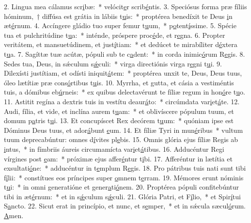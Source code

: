 2. Lingua mea cálamus scr\uline{i}bæ:~* velócit\uline{e}r scrib\uline{é}ntis.
3. Speciósus forma præ fíliis hóminum,~† diffúsa est grátia in lábiis t\uline{u}is:~* proptérea benedíxit te Deus \uline{i}n æt\uline{é}rnum.
4. Accíngere gládio tuo super femur t\uline{u}um,~* p\uline{o}tent\uline{í}ssime.
5. Spécie tua et pulchritúdine t\uline{u}a:~* inténde, próspere proc\uline{é}de, et r\uline{e}gna.
6. Propter veritátem, et mansuetúdinem, et just\uline{í}tiam:~* et dedúcet te mirabíliter d\uline{é}xtera t\uline{u}a.
7. Sagíttæ tuæ acútæ, pópuli sub te c\uline{a}dent:~* in corda inimic\uline{ó}rum R\uline{e}gis.
8. Sedes tua, Deus, in sǽculum s\uline{ǽ}culi:~* virga directiónis virga r\uline{e}gni t\uline{u}i.
9. Dilexísti justítiam, et odísti iniquit\uline{á}tem:~* proptérea unxit te, Deus, Deus tuus, óleo lætítiæ præ cons\uline{ó}rtibus t\uline{u}is.
10. Myrrha, et gutta, et cásia a vestiméntis tuis, a dómibus eb\uline{ú}rneis:~* ex quibus delectavérunt te fíliæ regum in hon\uline{ó}re t\uline{u}o.
11. Astitit regína a dextris tuis in vestítu deaur\uline{á}to:~* circúmdata var\uline{i}et\uline{á}te.
12. Audi, fília, et vide, et inclína aurem t\uline{u}am:~* et oblivíscere pópulum tuum, et domum p\uline{a}tris t\uline{u}i.
13. Et concupíscet Rex decórem t\uline{u}um:~* quóniam ipse est Dóminus Deus tuus, et ador\uline{á}bunt \uline{e}um.
14. Et fíliæ Tyri in mun\uline{é}ribus~* vultum tuum deprecabúntur: omnes d\uline{í}vites pl\uline{e}bis.
15. Omnis glória ejus fíliæ Regis ab \uline{i}ntus,~* in fímbriis áureis circumamícta var\uline{i}et\uline{á}tibus.
16. Adducéntur Regi vírgines post \uline{e}am:~* próximæ ejus affer\uline{é}ntur t\uline{i}bi.
17. Afferéntur in lætítia et exsultati\uline{ó}ne:~* adducéntur in t\uline{e}mplum R\uline{e}gis.
18. Pro pátribus tuis nati sunt tibi f\uline{í}lii:~* constítues eos príncipes super \uline{o}mnem t\uline{e}rram.
19. Mémores erunt nóminis t\uline{u}i:~* in omni generatióne et gener\uline{a}ti\uline{ó}nem.
20. Proptérea pópuli confitebúntur tibi in æt\uline{é}rnum:~* et in s\uline{ǽ}culum s\uline{ǽ}culi.
21. Glória Patri, et F\uline{í}lio,~* et Spir\uline{í}tui S\uline{a}ncto.
22. Sicut erat in princípio, et nunc, et s\uline{e}mper,~* et in sǽcula sæcul\uline{ó}rum. \uline{A}men.
